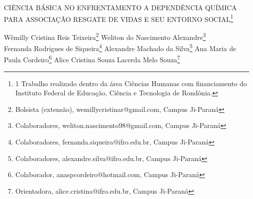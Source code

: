 \documentclass[article,12pt,onesidea,4paper,english,brazil]{abntex2}
\begin{document}
	
	
	\frenchspacing 
	
	\begin{center}
		\LARGE CIÊNCIA BÁSICA NO ENFRENTAMENTO A DEPENDÊNCIA QUÍMICA PARA ASSOCIAÇÃO RESGATE DE VIDAS E SEU ENTORNO SOCIAL\footnote{1	Trabalho realizado dentro da área Ciências Humanas com financiamento do Instituto Federal de Educação, Ciência e Tecnologia de Rondônia.}
		
		\normalsize
		Wêmilly Cristina Reis Teixeira\footnote{Bolsista (extensão), wemillycristinar@gmail.com, Campus Ji-Paraná} 
		Weliton do Nascimento Alexandre\footnote{Colaboradores, weliton.nascimento98@gmail.com,  Campus Ji-Paraná} \\
		Fernanda Rodrigues de Siqueira\footnote{Colaboradores, fernanda.siqueira@ifro.edu.br, Campus Ji-Paraná} 
		Alexandre Machado da Silva\footnote{Colaboradores, alexandre.silva@ifro.edu.br,  Campus Ji-Paraná}
		Ana Maria de Paula Cordeiro\footnote{Colaborador, anaspcordeiro@hotmail.com, Campus Ji-Paraná}
		Alice Cristina Souza Lacerda Melo Souza\footnote{Orientadora, alice.cristina@ifro.edu.br, Campus Ji-Paraná} 
	\end{center}
	
\end{document}
